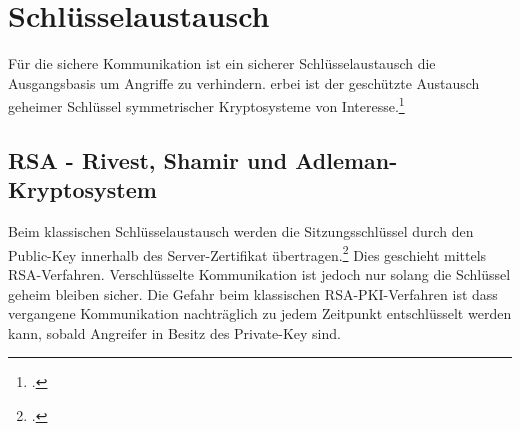 \documentclass  [paper=a4,
				fontsize=12pt,
				listof=totoc,
				bibliography=totoc
				]{scrreprt}
\begin{document}
		\section{Schlüsselaustausch}
			Für die sichere Kommunikation ist ein sicherer Schlüsselaustausch die Ausgangsbasis um Angriffe zu verhindern. \glqq erbei ist der geschützte Austausch geheimer Schlüssel symmetrischer Kryptosysteme von Interesse.\grqq\footcite[S. 437]{Eckert2013}
			\subsection{RSA - Rivest, Shamir und Adleman-Kryptosystem} 
				Beim klassischen Schlüsselaustausch werden die Sitzungsschlüssel durch den Public-Key innerhalb des Server-Zertifikat übertragen.\footcite[Vgl.][]{Boeck2013} Dies geschieht mittels \ac{RSA}-Verfahren. Verschlüsselte Kommunikation ist jedoch nur solang die Schlüssel geheim bleiben sicher. Die Gefahr beim klassischen \ac{RSA}-\ac{PKI}-Verfahren ist dass vergangene Kommunikation nachträglich zu jedem Zeitpunkt entschlüsselt werden kann, sobald Angreifer in Besitz des Private-Key sind.\medskip\\
\end{document}

